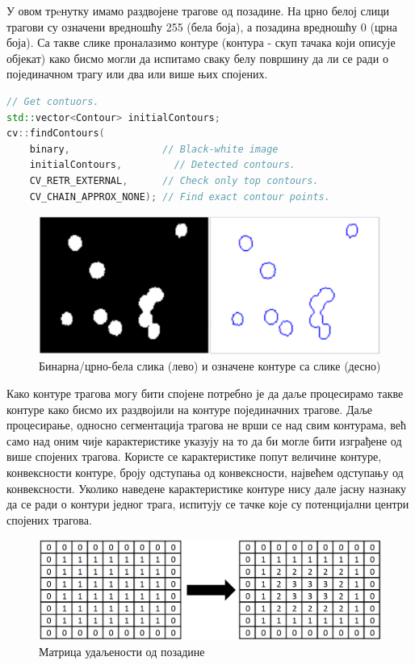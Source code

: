 \documentclass[12pt,a4paper,serbian,oneside]{book}
\begin{document}
У овом трeнутку имамо раздвојене трагове од позадине. На црно белој слици трагови су означени вредношћу 255 (бела боја), а позадина вредношћу 0 (црна боја). Са такве слике проналазимо контуре (контура - скуп тачака који описује објекат) како бисмо могли да испитамо сваку белу површину да ли се ради о појединачном трагу или два или више њих спојених. 

 \begin{lstlisting}[language=C++,label=lst:detectContours,caption=Детекција контура трагова]
// Get contuors.
std::vector<Contour> initialContours;
cv::findContours(
    binary,                // Black-white image
    initialContours,	     // Detected contours.
    CV_RETR_EXTERNAL,      // Check only top contours.
    CV_CHAIN_APPROX_NONE); // Find exact contour points.
\end{lstlisting}

\begin{figure}[htb]
\begin{center}
\leavevmode
\includegraphics[width=150mm]{images/seg_bin_con.png}
\end{center}
\caption{Бинарна/црно-бела слика (лево) и означене контуре са слике (десно)}
\label{fig:cv}
\end{figure}

Како контуре трагова могу бити спојене  потребно је да даље процесирамо такве контуре како бисмо их раздвојили на контуре појединачних трагове. Даље процесирање, односно сегментација трагова не врши се над свим контурама, већ само над оним чије карактеристике указују на то да би могле бити изграђене од више спојених трагова. Користе се карактеристике попут величине контуре, конвексности контуре, броју одступања од конвексности, највећем одступању од конвексности. Уколико наведене карактеристике контуре нису дале јасну назнаку да се ради о контури једног трага, испитују се тачке које су потенцијални центри спојених трагова.

\begin{figure}[htb]
\begin{center}
\includegraphics[width=120mm]{images/distance_matrix.png}
\end{center}
\caption{Матрица удаљености од позадине}
\label{fig:dist_matric}
\end{figure}
\end{document}
